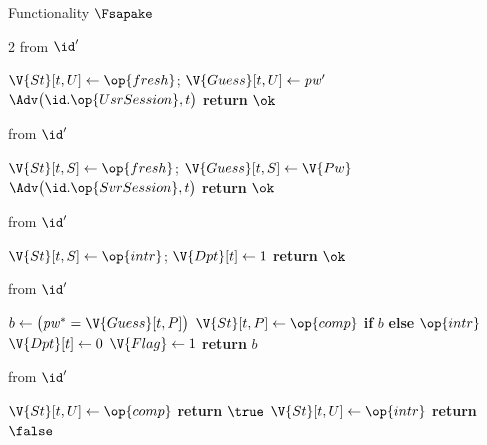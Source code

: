 \begin{interface}[nofloat]{Functionality $\Fsapake$ \\
}
{\begin{multicols}{2}
 \quad from $\id'$
\begin{algorithmic}[1]
\algcont
{}
\State $\V{St}[t,U] \gets \op{fresh}$; \quad $\V{Guess}[t,U] \gets \mathit{pw}'$
\State $\Adv\bigl(\id.\op{UsrSession}, t\bigr)$
\State \textbf{return} $\ok$
\algsave
\end{algorithmic}
\vspace{1.4ex}

 \quad from $\id'$
\begin{algorithmic}[1]
\algcont
{}
\State $\V{St}[t,S] \gets \op{fresh}$; \quad $\V{Guess}[t,S] \gets \V{Pw}$
\State $\Adv\bigl(\id.\op{SvrSession}, t\bigr)$
\State \textbf{return} $\ok$
\algsave
\end{algorithmic}
\vspace{1.4ex}

\columnbreak

 \quad from $\id'$
\begin{algorithmic}[1]
\algcont
{}
\State $\V{St}[t,S] \gets \op{intr}$; \quad $\V{Dpt}[t] \gets 1$ \label{ln:sapakeint}
\State \textbf{return} $\ok$
\algsave
\end{algorithmic}
\vspace{1.4ex}

 \quad from $\id'$
\begin{algorithmic}[1]
\algcont
{}
\State $b \gets \bigl(\mathit{pw}^{*} = \V{Guess}[t,P]\bigr)$
  \State $\V{St}[t,P] \gets \op{comp}$ \textbf{if} $b$ \textbf{else} $\op{intr}$ \label{ln:sapakeonline}
\EndIf
{}
  \State $\V{Dpt}[t] \gets 0$ \label{ln:sapakedpt}
\EndIf
{}
  \State $\V{Flag} \gets 1$ \label{ln:sapakeflagset}
\EndIf
\State \textbf{return} $b$
\algsave
\end{algorithmic}
\vspace{1.4ex}

 \quad from $\id'$
\begin{algorithmic}[1]
\algcont
{}
 \label{ln:sapakeimp}
  \State $\V{St}[t,U] \gets \op{comp}$
  \State \textbf{return} $\true$
\EndIf
\State $\V{St}[t,U] \gets \op{intr}$
\State \textbf{return} $\false$
\algsave
\end{algorithmic}
\vspace{1.4ex}


\end{multicols}}
\end{interface}
